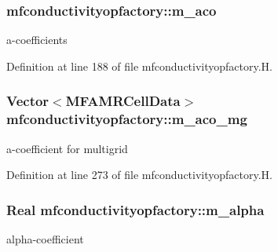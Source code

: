\subsubsection[{\texorpdfstring{m\+\_\+aco}{m_aco}}]{ mfconductivityopfactory\+::m\+\_\+aco\hspace{0.3cm}{\ttfamily [protected]}}\hypertarget{classmfconductivityopfactory_ac582c0c89ad102e64ffb6d79489b94b0}{}\label{classmfconductivityopfactory_ac582c0c89ad102e64ffb6d79489b94b0}


a-\/coefficients 



Definition at line 188 of file mfconductivityopfactory.\+H.

\subsubsection[{\texorpdfstring{m\+\_\+aco\+\_\+mg}{m_aco_mg}}]{\setlength{\rightskip}{0pt plus 5cm}Vector$<${\bf M\+F\+A\+M\+R\+Cell\+Data}$>$ mfconductivityopfactory\+::m\+\_\+aco\+\_\+mg\hspace{0.3cm}{\ttfamily [protected]}}\hypertarget{classmfconductivityopfactory_a34442483f0fbafd7e2fda7a03cf2fd35}{}\label{classmfconductivityopfactory_a34442483f0fbafd7e2fda7a03cf2fd35}


a-\/coefficient for multigrid 



Definition at line 273 of file mfconductivityopfactory.\+H.

\subsubsection[{\texorpdfstring{m\+\_\+alpha}{m_alpha}}]{\setlength{\rightskip}{0pt plus 5cm}Real mfconductivityopfactory\+::m\+\_\+alpha\hspace{0.3cm}{\ttfamily [protected]}}\hypertarget{classmfconductivityopfactory_a7c2c3e472b0fe6f02c91426f7ddc457b}{}\label{classmfconductivityopfactory_a7c2c3e472b0fe6f02c91426f7ddc457b}


alpha-\/coefficient 



